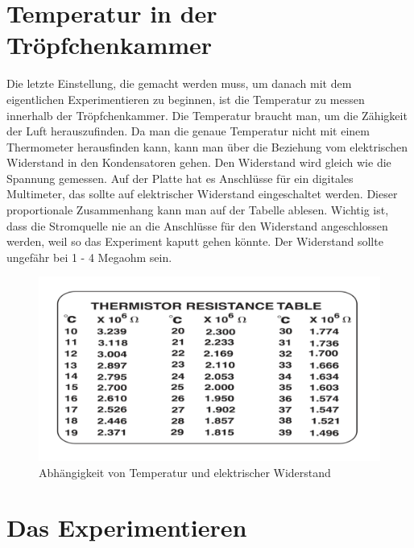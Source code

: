 \section{Temperatur in der Tröpfchenkammer}\label{sec:Temperatur}
Die letzte Einstellung, die gemacht werden muss, um danach mit dem eigentlichen Experimentieren zu beginnen, ist die Temperatur zu messen innerhalb der Tröpfchenkammer. Die Temperatur braucht man, um die Zähigkeit der Luft herauszufinden. Da man die genaue Temperatur nicht mit einem Thermometer herausfinden kann, kann man über die Beziehung vom elektrischen Widerstand in den Kondensatoren gehen. Den Widerstand wird gleich wie die Spannung gemessen. Auf der Platte hat es Anschlüsse für ein digitales Multimeter, das sollte auf elektrischer Widerstand eingeschaltet werden. Dieser proportionale Zusammenhang kann man auf der Tabelle ablesen. Wichtig ist, dass die Stromquelle nie an die Anschlüsse für den Widerstand angeschlossen werden, weil so das Experiment kaputt gehen könnte. Der Widerstand sollte ungefähr bei 1 - 4 Megaohm sein.

\begin{figure}[ht]
	\begin{center}
		\includegraphics[scale=0.25]{bilder/pdf/TemperaturTabelle.pdf}
		\caption{Abhängigkeit von Temperatur und elektrischer Widerstand}
		\label{fig:widerstandTemperatur}
	\end{center}
\end{figure}

\section{Das Experimentieren}\label{sec:durchfuehrung}
